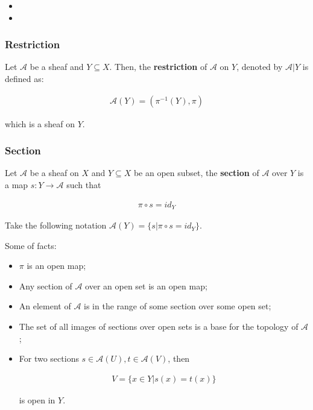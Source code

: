 \documentclass[Total.tex]{subfiles}
\begin{document}
		\begin{itemize}
			\item 
			\item 
		\end{itemize}
		
		\subsubsection{Restriction}
		
		\begin{Def}
			Let $\mathcal{A}$ be a sheaf and $Y\subseteq X$. Then, the \textbf{restriction} of $\mathcal{A}$ on $Y$, denoted by $\mathcal{A}|Y$ is defined as:
			
			\begin{gather*}
				\mathcal{A}(Y)=(\pi^{-1}(Y),\pi)
			\end{gather*}
			
			which is a sheaf on $Y$.
		\end{Def}
		
		
		
		\subsubsection{Section}
		
			\begin{Def}
				Let $\mathcal{A}$ be a sheaf on $X$ and $Y\subseteq X$ be an open subset, the \textbf{section} of $\mathcal{A}$ over $Y$ is a map $s:Y\rightarrow\mathcal{A}$ such that
				
				\begin{gather*}
					\pi\circ s=id_Y
				\end{gather*}
				
				Take the following notation $\mathcal{A}(Y)=\{s|\pi\circ s=id_Y\}$. 
			\end{Def}
			
			
			Some of facts:
			
			\begin{proposition}
				\begin{itemize}
					\item $\pi$ is an open map;
					\item Any section of $\mathcal{A}$ over an open set is an open map;
					\item An element of $\mathcal{A}$ is in the range of some section over some open set;
					\item The set of all images of sections over open sets is a base for the topology of $\mathcal{A}$;
					\item For two sections $s\in \mathcal{A}(U),t\in \mathcal{A}(V)$, then
					
					\begin{gather*}
						V=\{x\in Y|s(x)=t(x)\}
					\end{gather*}
					
					is open in $Y$.
				\end{itemize}
			\end{proposition}
			
\end{document}
